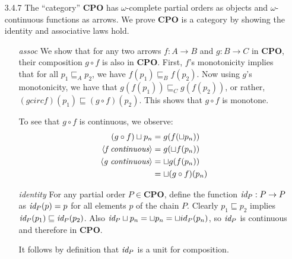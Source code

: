 \documentclass{article}
\newcommand{\cpo}{\mathbf{CPO}}
\newcommand{\id}{\emph{id}}
\begin{document}
\begin{enumerate}
\item[3.4.7]
  The ``category'' $\cpo$ has $\omega$-complete partial orders as objects and $\omega$-continuous functions as arrows.
  We prove $\cpo$ is a category by showing the identity and associative laws hold.
  \begin{itemize}
  \item[\emph{assoc}]
    We show that for any two arrows $f : A \rightarrow B$ and $g : B \rightarrow C$ in $\cpo$, their composition $g \circ f$ is also in $\cpo$.
    First, $f$'s monotonicity implies that for all $p_1 \sqsubseteq_A p_2$, we have $f(p_1) \sqsubseteq_B f(p_2)$.
    Now using $g$'s monotonicity, we have that $g(f(p_1)) \sqsubseteq_C g(f(p_2))$, or rather, $(g circ f)(p_1) \sqsubseteq (g \circ f)(p_2)$.
    This shows that $g \circ f$ is monotone.
    
    To see that $g \circ f$ is continuous, we observe:
    \begin{align*}
      (g \circ f) \sqcup p_n &= g(f(\sqcup p_n))
    \\\langle\emph{f continuous}\rangle    &= g(\sqcup f(p_n))
    \\\langle\emph{g continuous}\rangle    &= \sqcup g(f(p_n))
    \\                       &= \sqcup (g \circ f)(p_n)
    \end{align*}

  \item[\emph{identity}]
    For any partial order $P \in \cpo$, define the function $\id_P : P \rightarrow P$ as $\id_P(p) = p$ for all elements $p$ of the chain $P$.
    Clearly $p_1 \sqsubseteq p_2$ implies $\id_P(p_1) \sqsubseteq \id_P(p_2)$.
    Also $\id_P \sqcup p_n = \sqcup p_n = \sqcup id_P(p_n)$, so $\id_P$ is continuous and therefore in $\cpo$.

    It follows by definition that $\id_P$ is a unit for composition.
  \end{itemize}
\end{enumerate}
\end{document}
